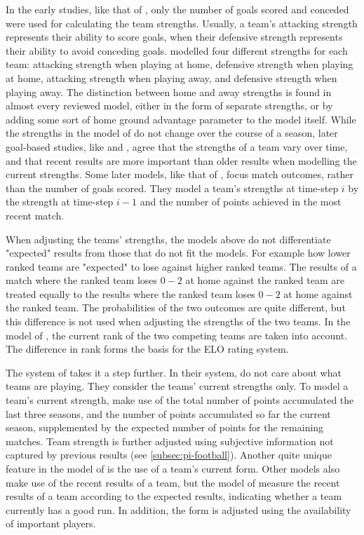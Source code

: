 In the early studies, like that of \citet{bib:maher-1982}, only the number of goals scored and conceded were used for calculating the team strengths. Usually, a team's attacking strength represents their ability to score goals, when their defensive strength represents their ability to avoid conceding goals. \citet{bib:maher-1982} modelled four different strengths for each team: attacking strength when playing at home, defensive strength when playing at home, attacking strength when playing away, and defensive strength when playing away. The distinction between home and away strengths is found in almost every reviewed model, either in the form of separate strengths, or by adding some sort of home ground advantage parameter to the model itself. While the strengths in the model of \citet{bib:maher-1982} do not change over the course of a season, later goal-based studies, like \citet{bib:dixon-coles-1997} and \citet{bib:rue-salvesen-2000}, agree that the strengths of a team vary over time, and that recent results are more important than older results when modelling the current strengths. Some later models, like that of \citet{bib:cattelan-varin-firth-2013}, focus match outcomes, rather than the number of goals scored. They model a team's strengths at time-step $i$ by the strength at time-step $i-1$ and the number of points achieved in the most recent match.

When adjusting the teams' strengths, the models above do not differentiate "expected" results from those that do not fit the models. For example how lower ranked teams are "expected" to lose against higher ranked teams. The results of a match where the  ranked team loses $0-2$ at home against the  ranked team are treated equally to the results where the  ranked team loses $0-2$ at home against the  ranked team. The probabilities of the two outcomes are quite different, but this difference is not used when adjusting the strengths of the two teams. In the model of \citet{bib:hvattum-arntzen-2010}, the current rank of the two competing teams are taken into account. The difference in rank forms the basis for the ELO rating system.

The system of \citet{bib:constantinou-fenton-neil-2012} takes it a step further. In their system, \citet{bib:constantinou-fenton-neil-2012} do not care about what teams are playing. They consider the teams' current strengths only. To model a team's current strength, \citet{bib:constantinou-fenton-neil-2012} make use of the total number of points accumulated the last three seasons, and the number of points accumulated so far the current season, supplemented by the expected number of points for the remaining matches. Team strength is further adjusted using subjective information not captured by previous results (see \cref{subsec:pi-football}). Another quite unique feature in the model of \citet{bib:constantinou-fenton-neil-2012} is the use of a team's current form. Other models also make use of the recent results of a team, but the model of \citet{bib:constantinou-fenton-neil-2012} measure the recent results of a team according to the expected results, indicating whether a team currently has a good run. In addition, the form is adjusted using the availability of important players.

